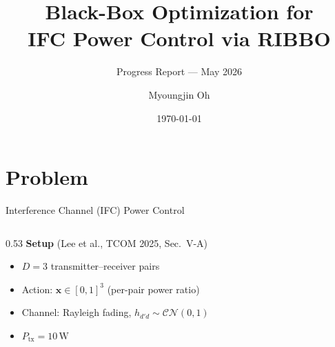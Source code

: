 \documentclass[10pt,aspectratio=169]{beamer}
\title{Black-Box Optimization for\\IFC Power Control via RIBBO}
\subtitle{Progress Report --- May 2026}
\author{Myoungjin Oh}
\date{\today}
\newenvironment{tightitemize}{%
    \begin{itemize}
        \setlength{\itemsep}{1pt}
        \setlength{\parskip}{0pt}
        \setlength{\parsep}{0pt}
}{%
    \end{itemize}
}
\begin{document}
\begin{frame}[plain]
    \titlepage
\end{frame}

\section{Problem}

\begin{frame}{Interference Channel (IFC) Power Control}
    \small
    \begin{columns}[T,onlytextwidth]
        \begin{column}{0.53\textwidth}
            \textbf{Setup} \hfill {\scriptsize (Lee et al., TCOM 2025, Sec.~V-A)}
            \begin{tightitemize}
                \item $D{=}3$ transmitter--receiver pairs
                \item Action: $\mathbf{x} \in [0,1]^3$ (per-pair power ratio)
                \item Channel: Rayleigh fading, $h_{d'd} \sim \mathcal{CN}(0,1)$
                \item $P_{\mathrm{tx}} = 10\,\text{W}$
            \end{tightitemize}


\end{column}
\end{columns}
\end{frame}
\end{document}
